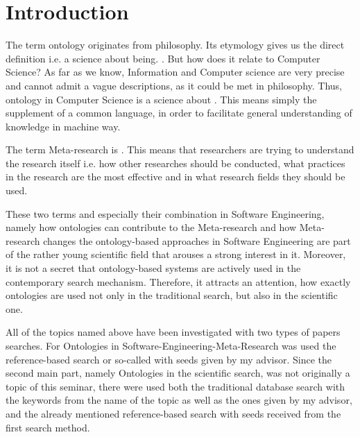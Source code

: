 
\section{Introduction}
\label{ch:Introduction}
The term ontology originates from philosophy. Its etymology gives us the direct definition i.e. a science about being. \frqq\cite{OntPh}. But how does it relate to Computer Science? As far as we know, Information and Computer science are very precise and cannot admit a vague descriptions, as it could be met in philosophy. Thus, ontology in Computer Science is a science about \frqq\cite{OntCS}. This means simply the supplement of a common language, in order to facilitate general understanding of knowledge in machine way. 

The term Meta-research is \frqq\cite{MR}. This means that researchers are trying to understand the research itself i.e. how other researches should be conducted, what practices in the research are the most effective and in what research fields they should be used. 

These two terms and especially their combination in Software Engineering, namely how ontologies can contribute to the Meta-research and how Meta-research changes the ontology-based approaches in Software Engineering are part of the rather young scientific field that arouses a strong interest in it. Moreover, it is not a secret that ontology-based systems are actively used in the contemporary search mechanism. Therefore, it attracts an attention, how exactly ontologies are used not only in the traditional search, but also in the scientific one.

All of the topics named above have been investigated with two types of papers searches. For Ontologies in Software-Engineering-Meta-Research was used the reference-based search or so-called \frqq\cite{Woh14} with seeds given by my advisor. Since the second main part, namely Ontologies in the scientific search, was not originally a topic of this seminar, there were used both the traditional database search with the keywords from the name of the topic as well as the ones given by my advisor, and the already mentioned reference-based search with seeds received from the first search method.

